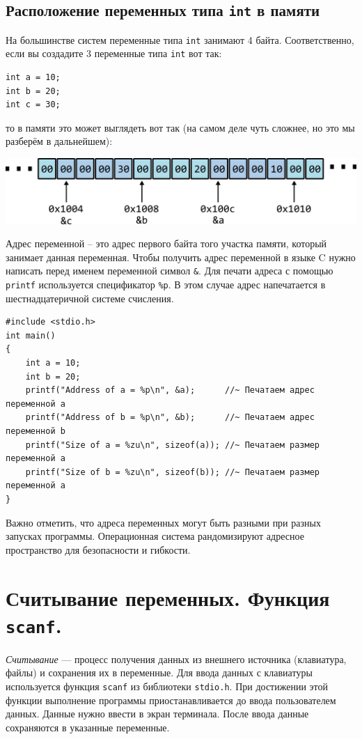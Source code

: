 \documentclass{article}
\begin{document}
\subsection*{Расположение переменных типа \texttt{int} в памяти}
На большинстве систем переменные типа \texttt{int} занимают 4 байта. Соответственно, если вы создадите 3 переменные типа \texttt{int} вот так:
\begin{lstlisting}
int a = 10;
int b = 20;
int c = 30;
\end{lstlisting}
то в памяти это может выглядеть вот так (на самом деле чуть сложнее, но это мы разберём в дальнейшем):
\begin{center}
\includegraphics[scale=1]{../images/memory2.png}
\end{center}
Адрес переменной -- это адрес первого байта того участка памяти, который занимает данная переменная.
Чтобы получить адрес переменной в языке C нужно написать перед именем переменной символ \texttt{\&}.
Для печати адреса с помощью \texttt{printf} используется спецификатор \texttt{\%p}. 
В этом случае адрес напечатается в шестнадцатеричной системе счисления.
\begin{lstlisting}
#include <stdio.h>
int main()
{
    int a = 10;
    int b = 20;
    printf("Address of a = %p\n", &a);    	//~ Печатаем адрес переменной a
    printf("Address of b = %p\n", &b);    	//~ Печатаем адрес переменной b
    printf("Size of a = %zu\n", sizeof(a));	//~ Печатаем размер переменной a
    printf("Size of b = %zu\n", sizeof(b));	//~ Печатаем размер переменной a
}
\end{lstlisting}
Важно отметить, что адреса переменных могут быть разными при разных запусках программы. Операционная система рандомизируют адресное пространство для безопасности и гибкости.


\section*{Считывание переменных. Функция \texttt{scanf}.}
\textit{Считывание} — процесс получения данных из внешнего источника (клавиатура, файлы) и сохранения их в переменные.
Для ввода данных с клавиатуры используется функция \texttt{scanf} из библиотеки \texttt{stdio.h}. При достижении этой функции выполнение программы приостанавливается до ввода пользователем данных. Данные нужно ввести в экран терминала. После ввода данные сохраняются в указанные переменные.
\end{document}
